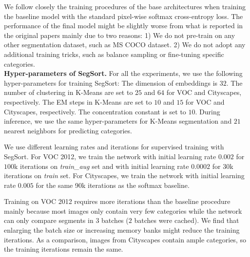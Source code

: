 \documentclass[10pt,twocolumn,letterpaper]{article}
\begin{document}
We follow closely the training procedures of the base architectures when training the baseline model with the standard pixel-wise softmax cross-entropy loss. The performance of the final model might be slightly worse from what is reported in the original papers mainly due to two reasons: 1) We do not pre-train on any other segmentation dataset, such as MS COCO \cite{lin2014microsoft} dataset. 2) We do not adopt any additional training tricks, such as balance sampling or fine-tuning specific categories. \\


\vspace{-6pt}
\noindent \textbf{Hyper-parameters of SegSort.}
For all the experiments, we use the following hyper-parameters for training SegSort: The dimension of embeddings is $32$. The number of clustering in K-Means are set to $25$ and $64$ for VOC and Cityscapes, respectively. The EM steps in K-Means are set to $10$ and $15$ for VOC and Cityscapes, respectively. The concentration constant is set to $10$. During inference, we use the same hyper-parameters for K-Means segmentation and $21$ nearest neighbors for predicting categories.


We use different learning rates and iterations for supervised training with SegSort. For VOC 2012, we train the network with initial learning rate $0.002$ for $100$k iterations on {\it train\_aug} set and with initial learning rate $0.0002$ for $30$k iterations on {\it train} set. For Cityscapes, we train the network with initial learning rate $0.005$ for the same 90k iterations as the softmax baseline.

Training on VOC 2012 requires more iterations than the baseline procedure mainly because most images only contain very few categories while the network can only compare segments in $3$ batches ($2$ batches were cached). We find that enlarging the batch size or increasing memory banks might reduce the training iterations. As a comparison, images from Cityscapes contain ample categories, so the training iterations remain the same.
\end{document}
